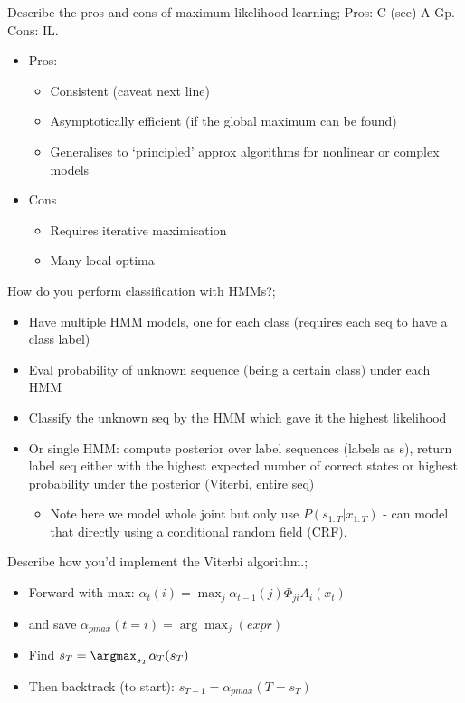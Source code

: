 \documentclass{article}
\begin{document}
Describe the pros and cons of maximum likelihood learning; Pros: C (see) A Gp. Cons: IL. \begin{itemize} \item Pros: \begin{itemize} \item Consistent (caveat next line) \item Asymptotically efficient (if the global maximum can be found) \item Generalises to `principled' approx algorithms for nonlinear or complex models  \end{itemize} \item Cons \begin{itemize} \item Requires iterative maximisation \item Many local optima \end{itemize} \end{itemize}

How do you perform classification with HMMs?; \begin{itemize} \item Have multiple HMM models, one for each class (requires each seq to have a class label) \item Eval probability of unknown sequence (being a certain class) under each HMM \item Classify the unknown seq by the HMM which gave it the highest likelihood \item Or single HMM: compute posterior over label sequences (labels as s), return label seq either with the highest expected number of correct states or highest probability under the posterior (Viterbi, entire seq) \begin{itemize} \item Note here we model whole joint but only use $P(s_{1:T}|x_{1:T})$ - can model that directly using a conditional random field (CRF). \end{itemize} \end{itemize}

Describe how you'd implement the Viterbi algorithm.; \begin{itemize}
    \item Forward with  max: $\alpha_t(i) = \max_j \alpha_{t-1}(j)\Phi_{ji}A_i(x_t)$
    \item and save $\alpha_{pmax}(t=i)=\arg\max_j (expr)$
    \item Find $s_T = \argmax_{s_T}\alpha_T(s_T)$
    \item Then backtrack (to start): $s_{T-1} = \alpha_{pmax}(T = s_T)$
\end{itemize}

\end{document}
